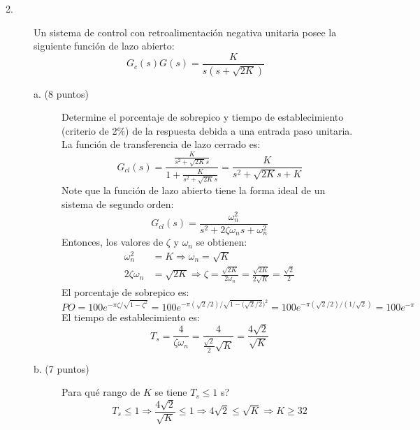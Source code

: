 \documentclass[11pt, spanish]{article}
\begin{document}
\begin{description}
			\item [2.] Un sistema de control con retroalimentación negativa unitaria posee la siguiente función de lazo abierto:
			\begin{equation*}
				G_c(s)G(s) = \frac{K}{s(s+\sqrt{2K})}
			\end{equation*}
			\begin{description}
				\item [a. (8 puntos)] Determine el porcentaje de sobrepico y tiempo de establecimiento (criterio de 2\%) de la respuesta debida a una entrada paso unitaria.\\
				La función de transferencia de lazo cerrado es:
				\begin{equation*}
					G_{cl}(s) = \frac{\frac{K}{s^2+\sqrt{2K}s}}{1+\frac{K}{s^2+\sqrt{2K}s}} = \frac{K}{s^2+\sqrt{2K}s+K}
				\end{equation*}
				Note que la función de lazo abierto tiene la forma ideal de un sistema de segundo orden:
				\begin{equation*}
					G_{cl}(s) = \frac{\omega_n^2}{s^2 + 2\zeta \omega_n s + \omega_n^2}
				\end{equation*}
				Entonces, los valores de $\zeta$ y $\omega_n$ se obtienen:
				\begin{align*}
					\omega_n^2 &= K \Rightarrow \omega_n = \sqrt{K}\\
					2\zeta \omega_n &= \sqrt{2K} \Rightarrow \zeta = \frac{\sqrt{2K}}{2\omega_n} = \frac{\sqrt{2K}}{2\sqrt{K}} = \frac{\sqrt{2}}{2}
				\end{align*}
				El porcentaje de sobrepico es:
				\begin{equation*}
					PO = 100e^{-\pi \zeta/\sqrt{1-\zeta^2}} = 100e^{-\pi (\sqrt{2}/2) / \sqrt{1-(\sqrt{2}/2})^2} = 100e^{-\pi (\sqrt{2}/2) / (1/\sqrt{2})} = 100e^{-\pi}
				\end{equation*}
				El tiempo de establecimiento es:
				\begin{equation*}
					T_s = \frac{4}{\zeta \omega_n} = \frac{4}{\frac{\sqrt{2}}{2}\sqrt{K}} = \frac{4\sqrt{2}}{\sqrt{K}}
				\end{equation*}

				\item [b. (7 puntos)] Para qué rango de $K$ se tiene $T_s \leq 1$ s?\\
				\begin{equation*}
					T_s \leq 1 \Rightarrow \frac{4\sqrt{2}}{\sqrt{K}} \leq 1 \Rightarrow 4\sqrt{2} \leq \sqrt{K} \Rightarrow K \geq 32
				\end{equation*}
			\end{description}
			

\end{description}
\end{document}
